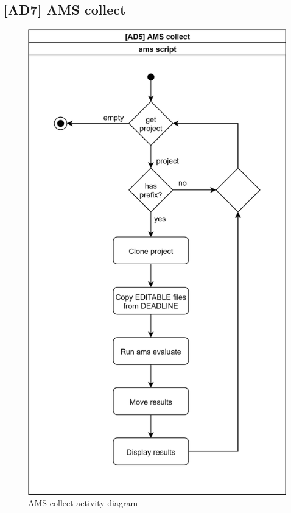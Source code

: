 \subsection{{[}AD7{]} AMS collect} \label{ssec:ad7}

\begin{figure}[H]
    \centering
    \includegraphics[width=\textwidth,height=.85\textheight,keepaspectratio]{Figures/ad/ad7.png}
    \caption{AMS collect activity diagram}
\end{figure}

